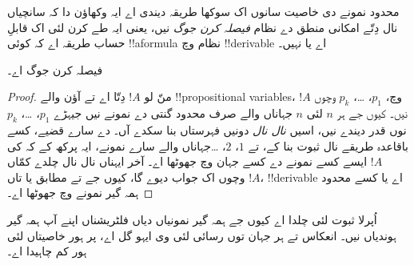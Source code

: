 \documentclass[../../../include/open-logic-section]{subfiles}
\begin{document}

محدود نمونے دی خاصیت سانوں اک سوکھا طریقہ دیندی اے ایہ وکھاؤن دا کہ سانچیاں نال دِتّے امکانی منطق دے نظام \emph{فیصلہ کرن جوگ} نیں، یعنی ایہ طے کرن لئی اک قابلِ حساب طریقہ اے کہ کوئی !!a{formula} نظام وچ !!{derivable} اے یا نہیں۔

\begin{thm}
   فیصلہ کرن جوگ اے۔
\end{thm}

\begin{proof}
  منّ لو $!A$ دِتّا اے تے آؤن والے !!{propositional variable}s، $!A$ وچ، $p_1$، \dots، $p_k$ وچوں نیں۔ کیوں جے ہر
  $n$ لئی $n$ جہاناں والے صرف محدود گنتی دے نمونے نیں جیہڑے
  $p_1$، \dots، $p_k$ نوں قدر دیندے نیں، اسیں \emph{نال نال} دونیں فہرستاں بنا سکدے آں۔  دے سارے قضیے، کسے باقاعدہ طریقے نال ثبوت بنا کے، تے $1$، $2$، \dots جہاناں والے سارے نمونے، ایہ پرکھ کے کہ کی $!A$ ایسے کسے نمونے دے کسے جہان وچ جھوٹھا اے۔ آخر ایہناں نال نال چلدے کمّاں وچوں اک جواب دیوے گا، کیوں جے
   تے  مطابق یا تاں
  $!A$، !!{derivable} اے یا کسے محدود ہمہ گیر نمونے وچ جھوٹھا اے۔
\end{proof}

اُپرلا ثبوت  لئی چلدا اے کیوں جے ہمہ گیر نمونیاں دیاں فلٹریشناں اپنے آپ ہمہ گیر ہوندیاں نیں۔ انعکاس تے ہر جہان توں رسائی لئی وی ایہو گل اے، پر ہور خاصیتاں لئی ہور کم چاہیدا اے۔
\end{document}
